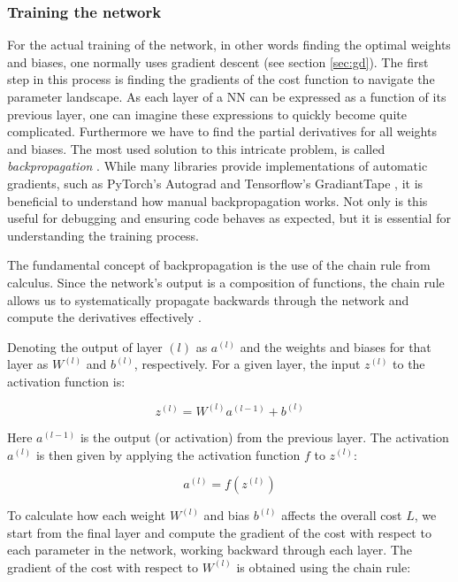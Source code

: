 \subsubsection{Training the network}
For the actual training of the network, in other words finding the optimal weights and biases, one normally uses gradient descent (see section \ref{sec:gd}). The first step in this process is finding the gradients of the cost function to navigate the parameter landscape. As each layer of a NN can be expressed as a function of its previous layer, one can imagine these expressions to quickly become quite complicated. Furthermore we have to find the partial derivatives for all weights and biases. The most used solution to this intricate problem, is called \textit{backpropagation} \citep[p. 200]{Goodfellow-et-al-2016}. While many libraries provide implementations of automatic gradients, such as PyTorch's Autograd \cite{Ansel_PyTorch_2_Faster_2024} and Tensorflow's GradiantTape \cite{Abadi_TensorFlow_Large-scale_machine_2015}, it is beneficial to understand how manual backpropagation works. Not only is this useful for debugging and ensuring code behaves as expected, but it is essential for understanding the training process. 

The fundamental concept of backpropagation is the use of the chain rule from calculus. Since the network's output is a composition of functions, the chain rule allows us to systematically propagate backwards through the network and compute the derivatives effectively \citep[Ch.2]{nielsen}. 

Denoting the output of layer $(l)$ as $ a^{(l)}$ and the weights and biases for that layer as $W^{(l)}$ and $b^{(l)}$, respectively. For a given layer, the input $z^{(l)}$ to the activation function is:

\begin{equation}
z^{(l)} = W^{(l)} a^{(l-1)} + b^{(l)}
\end{equation}

Here $a^{(l-1)}$ is the output (or activation) from the previous layer. The activation \( a^{(l)} \) is then given by applying the activation function $f$ to $z^{(l)}$:

\begin{equation}
a^{(l)} = f(z^{(l)})
\end{equation}

To calculate how each weight $ W^{(l)}$ and bias $b^{(l)}$ affects the overall cost $L$, we start from the final layer and compute the gradient of the cost with respect to each parameter in the network, working backward through each layer. The gradient of the cost with respect to $W^{(l)}$ is obtained using the chain rule:

